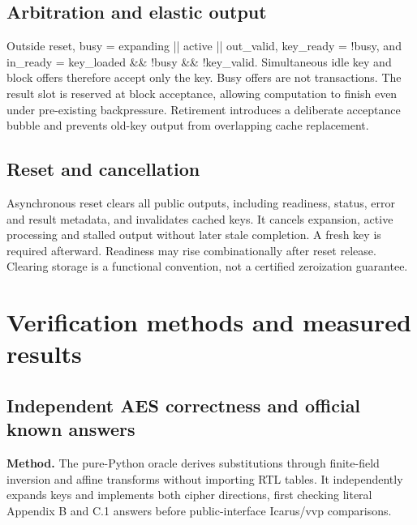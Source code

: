 \documentclass[11pt,a4paper]{article}
\begin{document}
\subsection{Arbitration and elastic output}

Outside reset,\allowbreak{} busy =\allowbreak{} expanding || active || out\_\allowbreak{}valid,\allowbreak{} key\_\allowbreak{}ready =\allowbreak{} !busy,\allowbreak{} and in\_\allowbreak{}ready =\allowbreak{} key\_\allowbreak{}loaded \&\& !busy \&\& !key\_\allowbreak{}valid. Simultaneous idle key and block offers therefore accept only the key. Busy offers are not transactions. The result slot is reserved at block acceptance,\allowbreak{} allowing computation to finish even under pre-existing backpressure. Retirement introduces a deliberate acceptance bubble and prevents old-key output from overlapping cache replacement.

\subsection{Reset and cancellation}

Asynchronous reset clears all public outputs,\allowbreak{} including readiness,\allowbreak{} status,\allowbreak{} error and result metadata,\allowbreak{} and invalidates cached keys. It cancels expansion,\allowbreak{} active processing and stalled output without later stale completion. A fresh key is required afterward. Readiness may rise combinationally after reset release. Clearing storage is a functional convention,\allowbreak{} not a certified zeroization guarantee.

\section{Verification methods and measured results}

\subsection{Independent AES correctness and official known answers}

\textbf{Method.} The pure-Python oracle derives substitutions through finite-field inversion and affine transforms without importing RTL tables. It independently expands keys and implements both cipher directions,\allowbreak{} first checking literal Appendix B and C.1 answers before public-interface Icarus/\allowbreak{}vvp comparisons.
\end{document}
